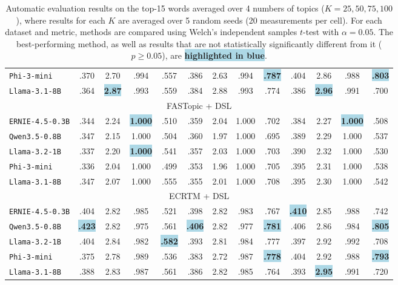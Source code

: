\begin{table}[ht]
\begin{adjustbox}{width=\linewidth}
\begin{tabular}{l *{12}{c}}
\texttt{Phi-3-mini} &
.370 & 2.70 & .994 & .557 & .386 & 2.63 & .994 & \colorbox{lightblue}{\textbf{.787}} & .404 & 2.86 & .988 & \colorbox{lightblue}{\textbf{.803}} \\
\texttt{Llama-3.1-8B} &
.364 & \colorbox{lightblue}{\textbf{2.87}} & .993 & .559 & .384 & 2.88 & .993 & .774 & .386 & \colorbox{lightblue}{\textbf{2.96}} & .991 & .700 \\
\midrule
\multicolumn{13}{c}{\large FASTopic + DSL} \\
\midrule
\texttt{ERNIE-4.5-0.3B} &
.344 & 2.24 & \colorbox{lightblue}{\textbf{1.000}} & .510 & .359 & 2.04 & 1.000 & .702 & .384 & 2.27 & \colorbox{lightblue}{\textbf{1.000}} & .508 \\
\texttt{Qwen3.5-0.8B} &
.347 & 2.15 & 1.000 & .504 & .360 & 1.97 & 1.000 & .695 & .389 & 2.29 & 1.000 & .537 \\
\texttt{Llama-3.2-1B} &
.337 & 2.20 & \colorbox{lightblue}{\textbf{1.000}} & .541 & .357 & 2.03 & 1.000 & .703 & .390 & 2.32 & 1.000 & .530 \\
\texttt{Phi-3-mini} &
.336 & 2.04 & 1.000 & .499 & .353 & 1.96 & 1.000 & .705 & .395 & 2.31 & 1.000 & .538 \\
\texttt{Llama-3.1-8B} &
.347 & 2.07 & 1.000 & .555 & .355 & 2.01 & 1.000 & .708 & .395 & 2.30 & 1.000 & .542 \\
\midrule
\multicolumn{13}{c}{\large ECRTM + DSL} \\
\midrule
\texttt{ERNIE-4.5-0.3B} &
.404 & 2.82 & .985 & .521 & .398 & 2.82 & .983 & .767 & \colorbox{lightblue}{\textbf{.410}} & 2.85 & .988 & .742 \\
\texttt{Qwen3.5-0.8B} &
\colorbox{lightblue}{\textbf{.423}} & 2.82 & .975 & .561 & \colorbox{lightblue}{\textbf{.406}} & 2.82 & .977 & \colorbox{lightblue}{\textbf{.781}} & .406 & 2.86 & .984 & \colorbox{lightblue}{\textbf{.805}} \\
\texttt{Llama-3.2-1B} &
.404 & 2.84 & .982 & \colorbox{lightblue}{\textbf{.582}} & .393 & 2.81 & .984 & .777 & .397 & 2.92 & .992 & .708 \\
\texttt{Phi-3-mini} &
.375 & 2.78 & .989 & .536 & .383 & 2.72 & .987 & \colorbox{lightblue}{\textbf{.778}} & .404 & 2.92 & .988 & \colorbox{lightblue}{\textbf{.793}} \\
\texttt{Llama-3.1-8B} &
.388 & 2.83 & .987 & .561 & .386 & 2.82 & .985 & .764 & .393 & \colorbox{lightblue}{\textbf{2.95}} & .991 & .720 \\
\bottomrule
\end{tabular}
\end{adjustbox}
\caption{
Automatic evaluation results on the top-15 words averaged over 4 numbers of topics ($K=25, 50, 75, 100$), where results for each $K$ are averaged over 5 random seeds (20 measurements per cell).
For each dataset and metric, methods are compared using Welch's independent samples $t$-test \citep{welch1947generalization} with $\alpha=0.05$.
The best-performing method, as well as results that are not statistically significantly different from it ($p \ge 0.05$), are \colorbox{lightblue}{\textbf{highlighted in blue}}.
}
\label{tab:main-results}
\vspace{-1em}
\end{table}
